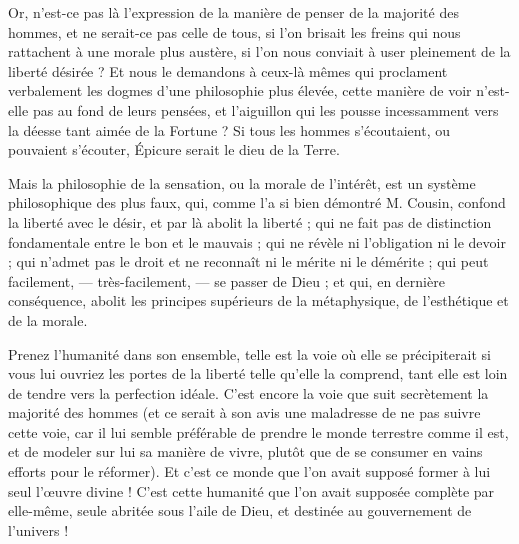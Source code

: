 \documentclass[a4paper, 11pt, oneside, landscape]{article}
\begin{document}
Or, n'est-ce pas là l'expression de la manière de penser de la majorité des hommes, et ne serait-ce pas celle de tous, si l'on brisait les freins qui nous rattachent à une morale plus austère, si l'on nous conviait à user pleinement de la liberté désirée ? Et nous le demandons à ceux-là mêmes qui proclament verbalement les dogmes d'une philosophie plus élevée, cette manière de voir n'est-elle pas au fond de leurs pensées, et l'aiguillon qui les pousse incessamment vers la déesse tant aimée de la Fortune ? Si tous les hommes s'écoutaient, ou pouvaient s'écouter, Épicure serait le dieu de la Terre.

Mais la philosophie de la sensation, ou la morale de l'intérêt, est un système philosophique des plus faux, qui, comme l'a si bien démontré M. Cousin, confond la liberté avec le désir, et par là abolit la liberté ; qui ne fait pas de distinction fondamentale entre le bon et le mauvais ; qui ne révèle ni l'obligation ni le devoir ; qui n'admet pas le droit et ne reconnaît ni le mérite ni le démérite ; qui peut facilement, --- très-facilement, --- se passer de Dieu ; et qui, en dernière conséquence, abolit les principes supérieurs de la métaphysique, de l'esthétique et de la morale.

Prenez l'humanité dans son ensemble, telle est la voie où elle se précipiterait si vous lui ouvriez les portes de la liberté telle qu'elle la comprend, tant elle est loin de tendre vers la perfection idéale. C'est encore la voie que suit secrètement la majorité des hommes (et ce serait à son avis une maladresse de ne pas suivre cette voie, car il lui semble préférable de prendre le monde terrestre comme il est, et de modeler sur lui sa manière de vivre, plutôt que de se consumer en vains efforts pour le réformer). Et c'est ce monde que l'on avait supposé former à lui seul l'œuvre divine ! C'est cette humanité que l'on avait supposée complète par elle-même, seule abritée sous l'aile de Dieu, et destinée au gouvernement de l'univers !
\end{document}
